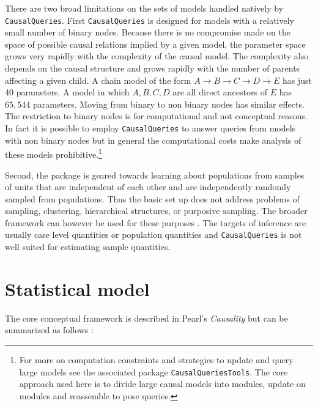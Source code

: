 \documentclass[
  11pt,
  article]{jss}
\begin{document}
There are two broad limitations on the sets of models handled natively
by \texttt{CausalQueries}. First \texttt{CausalQueries} is designed for
models with a relatively small number of binary nodes. Because there is
no compromise made on the space of possible causal relations implied by
a given model, the parameter space grows very rapidly with the
complexity of the causal model. The complexity also depends on the
causal structure and grows rapidly with the number of parents affecting
a given child. A chain model of the form
\(A \rightarrow B \rightarrow C \rightarrow D \rightarrow E\) has just
40 parameters. A model in which \(A, B, C, D\) are all direct ancestors
of \(E\) has \(65,544\) parameters. Moving from binary to non binary
nodes has similar effects. The restriction to binary nodes is for
computational and not conceptual reasons. In fact it is possible to
employ \texttt{CausalQueries} to answer queries from models with non
binary nodes but in general the computational costs make analysis of
these models prohibitive.\footnote{For more on computation constraints
  and strategies to update and query large models see the associated
  package \texttt{CausalQueriesTools}. The core approach used here is to
  divide large causal models into modules, update on modules and
  reassemble to pose queries.}

Second, the package is geared towards learning about populations from
samples of units that are independent of each other and are
independently randomly sampled from populations. Thus the basic set up
does not address problems of sampling, clustering, hierarchical
structures, or purposive sampling. The broader framework can however be
used for these purposes \citep[see section 9.4
of][]{humphreys_integrated_2023}. The targets of inference are usually
case level quantities or population quantities and
\texttt{CausalQueries} is not well suited for estimating sample
quantities.

\hypertarget{sec-theory}{%
\section{Statistical model}\label{sec-theory}}

The core conceptual framework is described in Pearl's \emph{Causality}
\citep{pearl_causality_2009} but can be summarized as follows
\citep[using the notation proposed in][]{humphreys_integrated_2023}:
\end{document}
